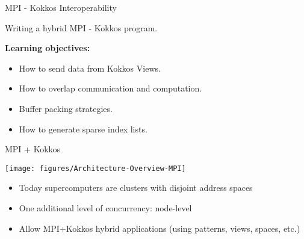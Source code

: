 %

\begin{frame}[fragile]

  {\Huge MPI - Kokkos Interoperability}

  \vspace{10pt}

  {\large Writing a hybrid MPI - Kokkos program.}

  \vspace{20pt}

  \textbf{Learning objectives:}
  \begin{itemize}
    \item {How to send data from Kokkos Views.}
    \item {How to overlap communication and computation.}
    \item {Buffer packing strategies.}
    \item {How to generate sparse index lists.}
  \end{itemize}

  \vspace{-20pt}

\end{frame}


\begin{frame}{MPI + Kokkos}
  \begin{center}
    \texttt{[image: figures/Architecture-Overview-MPI]}
  \end{center}

\begin{itemize}
	\item Today supercomputers are clusters with disjoint address spaces
	\item One additional level of concurrency: node-level
	\item Allow MPI+Kokkos hybrid applications (using patterns, views, spaces, etc.)
\end{itemize}

\end{frame}

